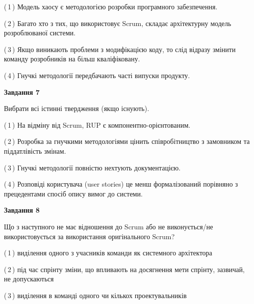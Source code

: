 \documentclass[10pt, ukrainian]{article}
\begin{document}
{\begin {large}
(\,1\,) Модель хаосу є методологією розробки програмного забезпечення. %



(\,2\,) Багато хто з тих, що використовує Scrum, складає архітектурну модель розроблюваної системи. %



(\,3\,) Якщо виникають проблеми з модифікацією коду, то слід відразу змінити команду розробників на більш кваліфіковану.%



(\,4\,) Гнучкі методології передбачають часті випуски продукту. %


{\begin {center}\textbf{Завдання 7}\end {center}}\par
Вибрати всі істинні твердження (якщо існують).\par
\vspace{2mm}



(\,1\,) На відміну від Scrum, RUP є компонентно-орієнтованим. %



(\,2\,) Розробка за гнучкими методологіями цінить співробітництво з замовником та піддатлівість змінам. %



(\,3\,) Гнучкі методології повністю нехтують документацією. %



(\,4\,) Розповіді користувача (user stories) це менш формалізований порівняно з прецедентами спосіб опису вимог до системи. %


{\begin {center}\textbf{Завдання 8}\end {center}}\par
Що з наступного не має відношення до Scrum або не виконується/не використовується за використання оригінального Scrum?\par
\vspace{2mm}



(\,1\,) виділення одного з учасників команди як системного архітектора%



(\,2\,) під час спрінту зміни, що впливають на досягнення мети спрінту, зазвичай, не допускаються%



(\,3\,) виділення в команді одного чи кількох проектувальників%




\end{large}}
\end{document}
